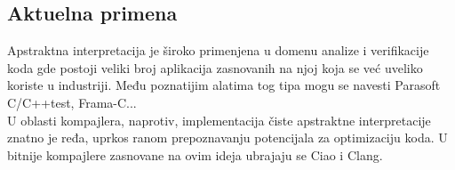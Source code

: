 \subsection{Aktuelna primena}
Apstraktna interpretacija je široko primenjena u domenu analize i verifikacije koda gde postoji veliki broj aplikacija zasnovanih na njoj koja se već uveliko koriste u industriji\cite{Wilhelm-Wachter}. Među poznatijim alatima tog tipa mogu se navesti Parasoft C/C++test, Frama-C... \\

U oblasti kompajlera, naprotiv, implementacija čiste apstraktne interpretacije znatno je ređa, uprkos ranom prepoznavanju potencijala za optimizaciju koda\cite{cousot}. 	U bitnije kompajlere zasnovane na ovim ideja ubrajaju se Ciao i Clang.

